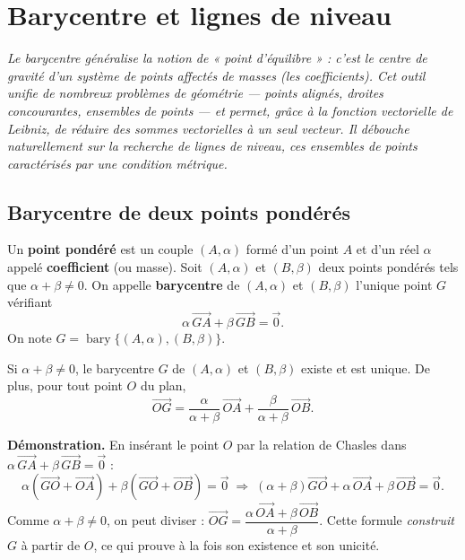 \providecommand{\bary}{\operatorname{bary}}
\chapter{Barycentre et lignes de niveau}
\textit{Le barycentre généralise la notion de « point d'équilibre » : c'est le centre
de gravité d'un système de points affectés de masses (les coefficients). Cet outil
unifie de nombreux problèmes de géométrie — points alignés, droites concourantes,
ensembles de points — et permet, grâce à la fonction vectorielle de Leibniz, de
réduire des sommes vectorielles à un seul vecteur. Il débouche naturellement sur la
recherche de \emph{lignes de niveau}, ces ensembles de points caractérisés par une
condition métrique.}

\section{Barycentre de deux points pondérés}

\begin{definition}
Un \textbf{point pondéré} est un couple $(A,\alpha)$ formé d'un point $A$ et d'un réel
$\alpha$ appelé \textbf{coefficient} (ou masse). Soit $(A,\alpha)$ et $(B,\beta)$ deux
points pondérés tels que $\alpha+\beta\neq 0$. On appelle \textbf{barycentre} de
$(A,\alpha)$ et $(B,\beta)$ l'unique point $G$ vérifiant
\[ \alpha\,\vec{GA}+\beta\,\vec{GB}=\vec{0}. \]
On note $G=\bary\{(A,\alpha),(B,\beta)\}$.
\end{definition}

\begin{theoreme}
Si $\alpha+\beta\neq 0$, le barycentre $G$ de $(A,\alpha)$ et $(B,\beta)$ existe et
est unique. De plus, pour tout point $O$ du plan,
\[ \vec{OG}=\frac{\alpha}{\alpha+\beta}\,\vec{OA}+\frac{\beta}{\alpha+\beta}\,\vec{OB}. \]
\end{theoreme}

\begin{remarque}
\textbf{Démonstration.} En insérant le point $O$ par la relation de Chasles dans
$\alpha\,\vec{GA}+\beta\,\vec{GB}=\vec{0}$ :
\[ \alpha(\vec{GO}+\vec{OA})+\beta(\vec{GO}+\vec{OB})=\vec{0}
   \;\Longrightarrow\;(\alpha+\beta)\vec{GO}+\alpha\,\vec{OA}+\beta\,\vec{OB}=\vec{0}. \]
Comme $\alpha+\beta\neq 0$, on peut diviser :
$\vec{OG}=\dfrac{\alpha\,\vec{OA}+\beta\,\vec{OB}}{\alpha+\beta}$. Cette formule
\emph{construit} $G$ à partir de $O$, ce qui prouve à la fois son existence et son
unicité.
\end{remarque}

